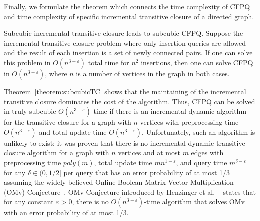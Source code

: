 Finally, we formulate the theorem which connects the time complexity of CFPQ and time complexity of specific incremental transitive closure of a directed graph.
\begin{theorem}{Subcubic incremental transitive closure leads to subcubic CFPQ.}
\label{theorem:subcubicTC}
Suppose the incremental transitive closure problem where only insertion queries are allowed and the result of each insertion is a set of newly connected pairs. If one can solve this problem in $O(n^{3-\varepsilon})$ total time for $n^2$ insertions, then one can solve CFPQ in $O(n^{3-\varepsilon})$, where $n$ is a number of vertices in the graph in both cases. 
\end{theorem}
Theorem~\ref{theorem:subcubicTC} shows that the maintaining of the incremental transitive closure dominates the cost of the algorithm. Thus, CFPQ can be solved in truly subcubic $O(n^{3-\varepsilon})$ time if there is an incremental dynamic algorithm for the transitive closure for a graph with $n$ vertices with preprocessing time $O(n^{3-\varepsilon})$ and total update time $O(n^{3-\varepsilon})$. Unfortunately, such an algorithm is unlikely to exist: it was proven that there is no incremental dynamic transitive closure algorithm for a graph with $n$ vertices and at most $m$ edges with preprocessing time $poly(m)$, total update time $mn^{1-\varepsilon}$, and query time $m^{\delta-\varepsilon}$ for any $\delta \in (0, 1/2]$ per query that has an error probability of at most 1/3 assuming the widely believed Online Boolean Matrix-Vector Multiplication (OMv) Conjecture~\cite{10.1145/2746539.2746609}. OMv Conjecture introduced by Henzinger et al. ~\cite{10.1145/2746539.2746609} states that for any constant $ \varepsilon>0$, there is no $O(n^{3-\varepsilon})$-time algorithm that solves OMv with an error probability of at most 1/3. 
